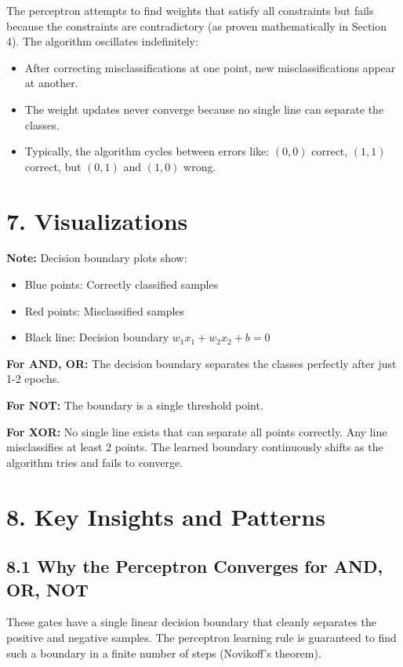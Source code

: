 \documentclass[11pt]{article}
\begin{document}
The perceptron attempts to find weights that satisfy all constraints but fails because the constraints are contradictory (as proven mathematically in Section 4). The algorithm oscillates indefinitely:
\begin{itemize}
\item After correcting misclassifications at one point, new misclassifications appear at another.
\item The weight updates never converge because no single line can separate the classes.
\item Typically, the algorithm cycles between errors like: $(0,0)$ correct, $(1,1)$ correct, but $(0,1)$ and $(1,0)$ wrong.
\end{itemize}

\section*{7. Visualizations}

\textbf{Note:} Decision boundary plots show:
\begin{itemize}
\item Blue points: Correctly classified samples
\item Red points: Misclassified samples
\item Black line: Decision boundary $w_1 x_1 + w_2 x_2 + b = 0$
\end{itemize}

\textbf{For AND, OR:} The decision boundary separates the classes perfectly after just 1-2 epochs.

\textbf{For NOT:} The boundary is a single threshold point.

\textbf{For XOR:} No single line exists that can separate all points correctly. Any line misclassifies at least 2 points. The learned boundary continuously shifts as the algorithm tries and fails to converge.

\section*{8. Key Insights and Patterns}

\subsection*{8.1 Why the Perceptron Converges for AND, OR, NOT}
These gates have a single linear decision boundary that cleanly separates the positive and negative samples. The perceptron learning rule is guaranteed to find such a boundary in a finite number of steps (Novikoff's theorem).
\end{document}
